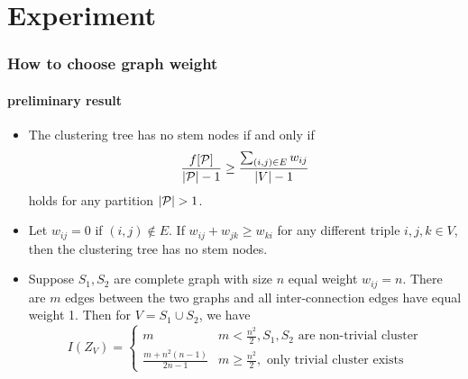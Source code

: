 \documentclass[notheorems]{beamer}
\begin{document}
\section{Experiment}
\frame{\tableofcontents[currentsection]}
\begin{frame}
	\frametitle{How to choose graph weight}
	\framesubtitle{preliminary result}
	\begin{proposition}
		\begin{itemize}
			\item The clustering tree has no stem nodes if and only if
			\begin{equation}
			\frac{f[\mathcal{P}]}{\lvert\mathcal{P}\rvert-1} \geq \frac{\sum_{(i,j) \in E} w_{ij}}{\lvert V\rvert-1}				
			\end{equation}
			holds for any partition $\lvert\mathcal{P}\rvert > 1$.
			\item Let $w_{ij}=0$ if $(i,j)\not\in E$. If $w_{ij} + w_{jk} \geq w_{ki}$ for any different triple $i, j, k \in V$, then the clustering tree has no stem nodes.
			\item Suppose $S_1, S_2 $ are complete graph with size $n$ equal weight $w_{ij}=n$. There are $m$ edges between the two graphs and all inter-connection edges have equal weight 1. Then for $V=S_1\cup S_2$, we have
			\begin{equation}
				I(Z_V) = \begin{cases}
					m & m <\frac{n^2}{2}, S_1,S_2 \textrm{ are non-trivial cluster} \\
					\frac{m+n^2(n-1)}{2n-1} & m\geq \frac{n^2}{2}, \textrm{ only trivial cluster exists} 
				\end{cases}
			\end{equation}
				
		\end{itemize}
	\end{proposition}
\end{frame}
\end{document}
